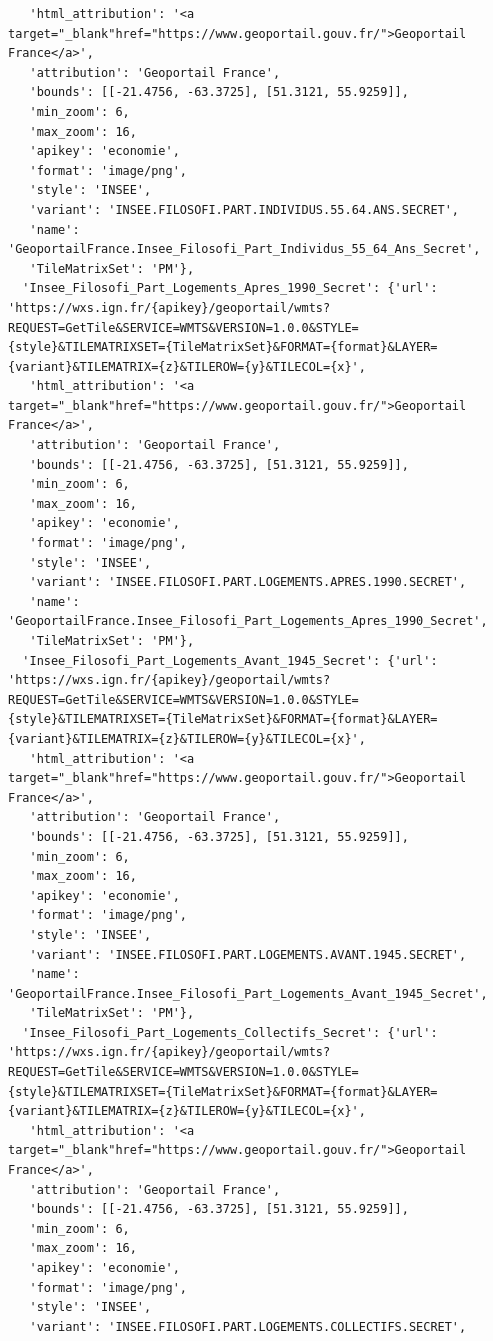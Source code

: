 \documentclass[
  letterpaper,
  DIV=11,
  numbers=noendperiod]{scrreprt}
\begin{document}
\begin{verbatim}
   'html_attribution': '<a target="_blank"href="https://www.geoportail.gouv.fr/">Geoportail France</a>',
   'attribution': 'Geoportail France',
   'bounds': [[-21.4756, -63.3725], [51.3121, 55.9259]],
   'min_zoom': 6,
   'max_zoom': 16,
   'apikey': 'economie',
   'format': 'image/png',
   'style': 'INSEE',
   'variant': 'INSEE.FILOSOFI.PART.INDIVIDUS.55.64.ANS.SECRET',
   'name': 'GeoportailFrance.Insee_Filosofi_Part_Individus_55_64_Ans_Secret',
   'TileMatrixSet': 'PM'},
  'Insee_Filosofi_Part_Logements_Apres_1990_Secret': {'url': 'https://wxs.ign.fr/{apikey}/geoportail/wmts?REQUEST=GetTile&SERVICE=WMTS&VERSION=1.0.0&STYLE={style}&TILEMATRIXSET={TileMatrixSet}&FORMAT={format}&LAYER={variant}&TILEMATRIX={z}&TILEROW={y}&TILECOL={x}',
   'html_attribution': '<a target="_blank"href="https://www.geoportail.gouv.fr/">Geoportail France</a>',
   'attribution': 'Geoportail France',
   'bounds': [[-21.4756, -63.3725], [51.3121, 55.9259]],
   'min_zoom': 6,
   'max_zoom': 16,
   'apikey': 'economie',
   'format': 'image/png',
   'style': 'INSEE',
   'variant': 'INSEE.FILOSOFI.PART.LOGEMENTS.APRES.1990.SECRET',
   'name': 'GeoportailFrance.Insee_Filosofi_Part_Logements_Apres_1990_Secret',
   'TileMatrixSet': 'PM'},
  'Insee_Filosofi_Part_Logements_Avant_1945_Secret': {'url': 'https://wxs.ign.fr/{apikey}/geoportail/wmts?REQUEST=GetTile&SERVICE=WMTS&VERSION=1.0.0&STYLE={style}&TILEMATRIXSET={TileMatrixSet}&FORMAT={format}&LAYER={variant}&TILEMATRIX={z}&TILEROW={y}&TILECOL={x}',
   'html_attribution': '<a target="_blank"href="https://www.geoportail.gouv.fr/">Geoportail France</a>',
   'attribution': 'Geoportail France',
   'bounds': [[-21.4756, -63.3725], [51.3121, 55.9259]],
   'min_zoom': 6,
   'max_zoom': 16,
   'apikey': 'economie',
   'format': 'image/png',
   'style': 'INSEE',
   'variant': 'INSEE.FILOSOFI.PART.LOGEMENTS.AVANT.1945.SECRET',
   'name': 'GeoportailFrance.Insee_Filosofi_Part_Logements_Avant_1945_Secret',
   'TileMatrixSet': 'PM'},
  'Insee_Filosofi_Part_Logements_Collectifs_Secret': {'url': 'https://wxs.ign.fr/{apikey}/geoportail/wmts?REQUEST=GetTile&SERVICE=WMTS&VERSION=1.0.0&STYLE={style}&TILEMATRIXSET={TileMatrixSet}&FORMAT={format}&LAYER={variant}&TILEMATRIX={z}&TILEROW={y}&TILECOL={x}',
   'html_attribution': '<a target="_blank"href="https://www.geoportail.gouv.fr/">Geoportail France</a>',
   'attribution': 'Geoportail France',
   'bounds': [[-21.4756, -63.3725], [51.3121, 55.9259]],
   'min_zoom': 6,
   'max_zoom': 16,
   'apikey': 'economie',
   'format': 'image/png',
   'style': 'INSEE',
   'variant': 'INSEE.FILOSOFI.PART.LOGEMENTS.COLLECTIFS.SECRET',

\end{verbatim}
\end{document}
